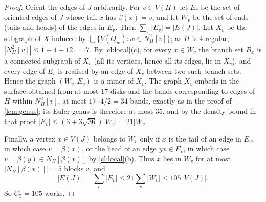 \documentclass[11pt,a4paper]{article}
\theoremstyle{plain}
\theoremstyle{definition}
\theoremstyle{remark}
\begin{document}
\begin{proof}
Orient the edges of $J$ arbitrarily. For $v\in V(H)$ let $E_v$ be the set of oriented edges of $J$ whose tail $x$ has $\beta(x)=v$, and let $W_v$ be the set of ends (tails and heads) of the edges in $E_v$. Then $\sum_v|E_v|=|E(J)|$. Let $X_v$ be the subgraph of $X$ induced by $\bigcup\{V(Q_w):w\in N^2_H[v]\}$; as $H$ is $4$-regular, $|N^2_H[v]|\le1+4+12=17$. By \cref{cl:local}(c), for every $x\in W_v$ the branch set $B_x$ is a connected subgraph of $X_v$ (all its vertices, hence all its edges, lie in $X_v$), and every edge of $E_v$ is realised by an edge of $X_v$ between two such branch sets. Hence the graph $(W_v,E_v)$ is a minor of $X_v$. The graph $X_v$ embeds in the surface obtained from at most $17$ disks and the bands corresponding to edges of $H$ within $N^2_H[v]$, at most $17\cdot4/2=34$ bands, exactly as in the proof of \cref{lem:genus}; its Euler genus is therefore at most $35$, and by the density bound in that proof $|E_v|\le(3+3\sqrt{36})|W_v|=21|W_v|$.

Finally, a vertex $x\in V(J)$ belongs to $W_v$ only if $x$ is the tail of an edge in $E_v$, in which case $v=\beta(x)$, or the head of an edge $yx\in E_v$, in which case $v=\beta(y)\in N_H[\beta(x)]$ by \cref{cl:local}(b). Thus $x$ lies in $W_v$ for at most $|N_H[\beta(x)]|=5$ blocks $v$, and
\[
 |E(J)|=\sum_v|E_v|\le21\sum_v|W_v|\le105\,|V(J)|.
\]
So $C_5=105$ works.
\end{proof}
\end{document}
